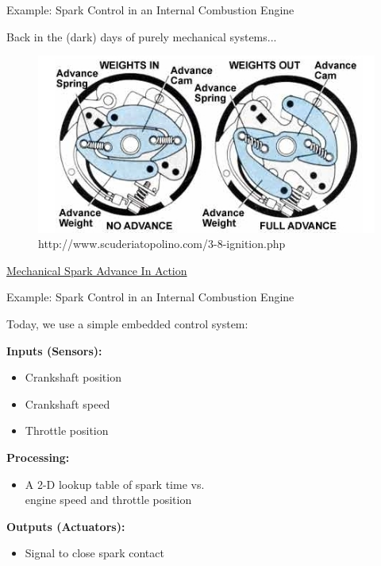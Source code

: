 \documentclass{beamer}
\begin{document}
	\begin{frame}[t]{Example: Spark Control in an Internal Combustion Engine}
		
		Back in the (dark) days of purely mechanical systems...
			
		\begin{figure}
		\includegraphics[scale=0.75]{img/3-8-ignition_clip_image005.jpg}
		\caption{http://www.scuderiatopolino.com/3-8-ignition.php}
		\end{figure}
		\href{https://www.youtube.com/watch?v=RcmkbQVPz9E}{Mechanical Spark Advance In Action}
		
	\end{frame}
	
	\begin{frame}{Example: Spark Control in an Internal Combustion Engine}
	
		Today, we use a simple embedded control system: 
				
		{\bf Inputs (Sensors):}
		\begin{itemize}
			\item Crankshaft position
			\item Crankshaft speed
			\item Throttle position
		\end{itemize}
		
		{\bf Processing:}
		\begin{itemize}
			\item A 2-D lookup table of spark time vs. \\
			engine speed and throttle position
		\end{itemize}
		
		{\bf Outputs (Actuators):}
		\begin{itemize}
			\item Signal to close spark contact
		\end{itemize}
	
	\end{frame}
	
\end{document}
